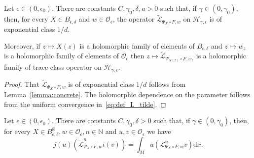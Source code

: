 \documentclass[AHL,Unicode,longabstracts,published]{cedram}
\newcommand{\p}[1]{\left(#1\right)}
\newcommand{\clO}{\mathcal{O}}
\newcommand{\clL}{\mathcal{L}}
\newcommand{\clH}{\mathcal{H}}
\newcommand{\bbN}{\mathbb{N}}
\newcommand{\bbR}{\mathbb{R}}
\newcommand{\rmd}{\mathrm{d}}
\newcommand{\clO}{\mathcal{O}}
\begin{document}
\begin{lemm}\label{lemma:properties_operator}
Let $\epsilon \in (0,\epsilon_0)$. There are constants $C,\gamma_0,\delta,a > 0$ such that, if $\gamma \in (0,\gamma_0)$, then, for every $X \in B_{\epsilon,\delta}$ and $w \in \clO_\epsilon$, the operator $\widetilde{\clL}_{\Psi_X \circ F,w}$ on $\clH_{\gamma,\epsilon}$ is of exponential class $1/d$.

Moreover, if $z \mapsto X(z)$ is a holomorphic family of elements of $B_{\epsilon,\delta}$ and $z \mapsto w_z$ is a holomorphic family of elements of $\clO_\epsilon$ then $z \mapsto \widetilde{\clL}_{\Psi_{X(z)} \circ F,w_z}$ is a holomorphic family of trace class operator on $\clH_{\gamma,\epsilon}$.
\end{lemm}

\begin{proof}
That $\widetilde{\clL}_{\Psi_X \circ F,w}$ is of exponential class $1/d$ follows from Lemma~\ref{lemma:concrete}. The holomorphic dependence on the parameter follows from the uniform convergence in~\eqref{eq:def_L_tilde}.
\end{proof}

\begin{lemm}\label{lemma:integrals_and_operators}
Let $\epsilon \in (0,\epsilon_0)$. There are constants $C,\gamma_0,\delta > 0$ such that, if $\gamma \in (0,\gamma_0)$, then, for every $X \in B_{\epsilon,\delta}^{\bbR},w \in \clO_\epsilon, n \in \bbN$ and $u,v \in \clO_\epsilon$ we have
\begin{equation}\label{eq:natural_inclusion}
j(u)\p{\widetilde{\clL}_{\Psi_X \circ F,w}^n \iota(v)} = \int_M u \left(\clL^n_{\Psi_X \circ F,w}v\right) \rmd x.
\end{equation}
\end{lemm}
\end{document}
